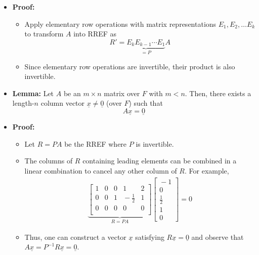 \documentclass[11pt,twoside]{report}
\newcommand{\vecnot}{\underline}
\newcommand{\Id}{{\mathrm{I}}}
\begin{document}
\begin{itemize}
\item \textbf{Proof:}
\begin{itemize}
\item Apply elementary row operations with matrix representations  $E_1, E_2, \dots E_k$ to transform $A$ into RREF as%
\[
R' = \underbrace{ E_k E_{k-1} \cdots E_1}_{  = P}  A 
\]
\item  Since elementary row operations are invertible, their product is also  invertible. 

\end{itemize}



\item \textbf{Lemma:} 
Let $A$ be an $m \times n$ matrix over $F$ with $m<n$. Then, there exists a length-$n$ column vector $\vecnot{x} \neq \vecnot{0}$ (over $F$) such that
\[
A \vecnot{x} = \vecnot{0}
\]

\item \textbf{Proof:} 
\begin{itemize}
\item Let $R = P A$ be the RREF where $P$ is invertible. 


\item The columns of $R$ containing leading elements can be combined in a linear combination to cancel any other column of $R$. For example, 
\begin{align}
 \underbrace{\begin{bmatrix}
1 & 0 & 0 & 1  & 2 \\
0 & 0 & 1 & \!\!\!-\frac{1}{2} & 1  \\
0 & 0 & 0 & 0 & 0 \\
\end{bmatrix}}_{R = PA} \begin{bmatrix}   \!- 1 \\ 0 \\  \tfrac{1}{2}   \\1 \\ 0  \end{bmatrix}   = 0 
\end{align}

\item Thus, one can construct a vector $\vecnot{x}$ satisfying $R\vecnot{x}=\vecnot{0}$ and observe that $A \vecnot{x} = P^{-1} R \vecnot{x} = \vecnot{0}$. \hfill \qedhere
\end{itemize}

  
  \end{itemize}
\end{document}
